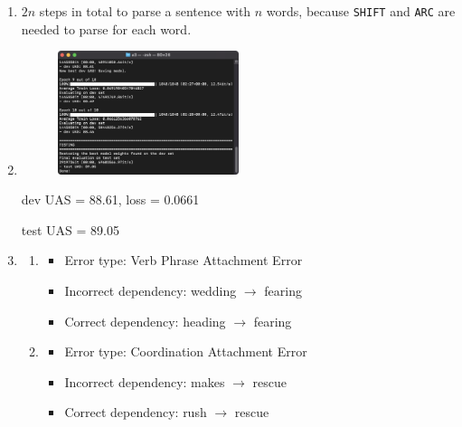 \documentclass[a4paper]{article}
\begin{document}
\begin{enumerate}[label=(\alph*)]
        \item $2n$ steps in total to parse a sentence with $n$ words, 
        because \texttt{SHIFT} and \texttt{ARC} are needed to parse for each word.

    \setcounter{enumi}{4}

        \item 
        \begin{figure}[h]
            \centering
            \includegraphics[width=0.5\textwidth]{best_uas.png}
            \label{fig:parser result}
        \end{figure}

        dev UAS = 88.61, loss = 0.0661
        
        test UAS = 89.05

        \item 
        \begin{enumerate}[label=\roman*.]
            \item         
            \begin{itemize}
                \item Error type: Verb Phrase Attachment Error
                \item Incorrect dependency: wedding $\rightarrow$ fearing
                \item Correct dependency: heading $\rightarrow$ fearing
            \end{itemize}

            \item
            \begin{itemize}
                \item Error type: Coordination Attachment Error
                \item Incorrect dependency: makes $\rightarrow$ rescue
                \item Correct dependency: rush $\rightarrow$ rescue
            \end{itemize}


\end{enumerate}
\end{enumerate}
\end{document}
